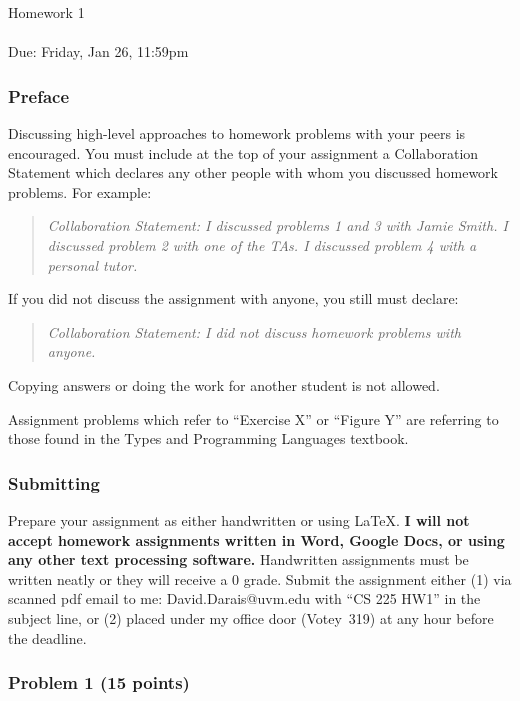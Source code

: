 \documentclass{article}
\begin{document}
\thispagestyle{fancy}
\begin{center}
 \Large{Homework 1} \\ \ \\ \normalsize{Due: Friday, Jan 26, 11:59pm}
\end{center}

\subsubsection*{Preface}

Discussing high-level approaches to homework problems with your peers is
encouraged. You must include at the top of your assignment a Collaboration
Statement which declares any other people with whom you discussed homework
problems. For example:
\begin{quote}\em
  Collaboration Statement: I discussed problems 1 and 3 with Jamie Smith. I
  discussed problem 2 with one of the TAs. I discussed problem 4 with a
  personal tutor.
\end{quote}
If you did not discuss the assignment with anyone, you still must declare:
\begin{quote}\em
  Collaboration Statement: I did not discuss homework problems with anyone.
\end{quote}
Copying answers or doing the work for another student is not allowed.

Assignment problems which refer to ``Exercise X'' or ``Figure Y'' are referring
to those found in the Types and Programming Languages textbook.

\subsubsection*{Submitting}

Prepare your assignment as either handwritten or using LaTeX. \textbf{I will
not accept homework assignments written in Word, Google Docs, or using any
other text processing software.} Handwritten assignments must be written neatly
or they will receive a 0 grade. Submit the assignment either (1) via scanned
pdf email to me: David.Darais@uvm.edu with ``CS 225 HW1'' in the subject line,
or (2) placed under my office door (Votey~319) at any hour before the deadline.

\subsubsection*{Problem 1 (15 points)}
\end{document}
